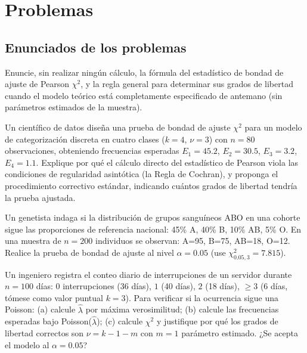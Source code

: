 \section*{Problemas}

\subsection*{Enunciados de los problemas}

\begin{problema}
	\label{prob:3f1ec07}
	Enuncie, sin realizar ningún cálculo, la fórmula del estadístico de bondad de ajuste de Pearson $\chi^2$, y la regla general para determinar sus grados de libertad cuando el modelo teórico está completamente especificado de antemano (sin parámetros estimados de la muestra).
\end{problema}

\begin{problema}
	\label{prob:d4859df}
	Un científico de datos diseña una prueba de bondad de ajuste $\chi^2$ para un modelo de categorización discreta en cuatro clases ($k=4$, $\nu=3$) con $n=80$ observaciones, obteniendo frecuencias esperadas $E_1=45.2$, $E_2=30.5$, $E_3=3.2$, $E_4=1.1$. Explique por qué el cálculo directo del estadístico de Pearson viola las condiciones de regularidad asintótica (la Regla de Cochran), y proponga el procedimiento correctivo estándar, indicando cuántos grados de libertad tendría la prueba ajustada.
\end{problema}

\begin{problema}
	\label{prob:da2eb15}
	Un genetista indaga si la distribución de grupos sanguíneos ABO en una cohorte sigue las proporciones de referencia nacional: 45\% A, 40\% B, 10\% AB, 5\% O. En una muestra de $n=200$ individuos se observan: A=95, B=75, AB=18, O=12. Realice la prueba de bondad de ajuste al nivel $\alpha=0.05$ (use $\chi^2_{0.05,3}=7.815$).
\end{problema}

\begin{problema}
	\label{prob:d6f0154}
	Un ingeniero registra el conteo diario de interrupciones de un servidor durante $n=100$ días: $0$ interrupciones (36 días), $1$ (40 días), $2$ (18 días), $\ge3$ (6 días, tómese como valor puntual $k=3$). Para verificar si la ocurrencia sigue una Poisson: (a) calcule $\hat\lambda$ por máxima verosimilitud; (b) calcule las frecuencias esperadas bajo Poisson($\hat\lambda$); (c) calcule $\chi^2$ y justifique por qué los grados de libertad correctos son $\nu=k-1-m$ con $m=1$ parámetro estimado. ¿Se acepta el modelo al $\alpha=0.05$?
\end{problema}

